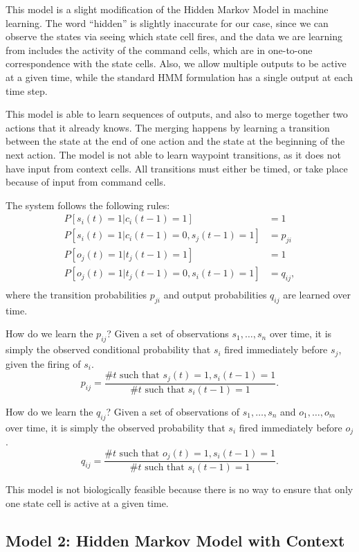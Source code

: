 \documentclass{article}
\theoremstyle{definition}
\begin{document}
This model is a slight modification of the Hidden Markov Model in
machine learning. The word ``hidden'' is slightly inaccurate for our
case, since we can observe the states via seeing which state cell
fires, and the data we are learning from includes the activity of the
command cells, which are in one-to-one correspondence with the state
cells. Also, we allow multiple outputs to be active at a given time,
while the standard HMM formulation has a single output at each time
step.

This model is able to learn sequences of outputs, and also to merge
together two actions that it already knows. The merging happens by
learning a transition between the state at the end of one action and
the state at the beginning of the next action. The model is not able
to learn waypoint transitions, as it does not have input from context
cells. All transitions must either be timed, or take place because of
input from command cells.

The system follows the following rules:
\begin{align*}
P \left[ s_i(t)=1 | c_i(t-1)=1 \right] &= 1 \\
P \left[ s_i(t)=1 | c_i(t-1)=0, s_j(t-1)=1 \right] &= p_{ji} \\
P \left[ o_j(t)=1 | t_j(t-1)=1 \right] &= 1 \\
P \left[ o_j(t)=1 | t_j(t-1)=0, s_i(t-1)=1 \right] &= q_{ij}, \\
\end{align*}
where the transition probabilities $p_{ji}$ and output probabilities
$q_{ij}$ are learned over time.

How do we learn the $p_{ij}$? Given a set of observations $s_1, \dots,
s_n$ over time, it is simply the observed conditional probability that
$s_{i}$ fired immediately before $s_j$, given the firing of $s_i$.
$$p_{ij} = \frac{\mbox{\# $t$ such that $s_j(t)=1, s_i(t-1)=1$}}
{\mbox{\# $t$ such that $s_i(t-1)=1$}}.$$

How do we learn the $q_{ij}$? Given a set of observations of $s_1,
\dots, s_n$ and $o_1, \dots, o_m$ over time, it is simply the observed
probability that $s_i$ fired immediately before $o_j$.
$$q_{ij} = \frac{\mbox{\# $t$ such that $o_j(t)=1, s_i(t-1)=1$}}
{\mbox{\# $t$ such that $s_i(t-1)=1$}}.$$

This model is not biologically feasible because there is no way to
ensure that only one state cell is active at a given time.

\subsection{Model 2: Hidden Markov Model with Context}
\end{document}
